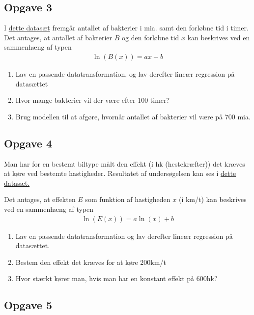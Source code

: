 \documentclass[12pt]{article}
\begin{document}
\subsection*{Opgave 3}

I \href{https://github.com/ChristianJLex/TeachingNotes/raw/master/2023-2024/Data%20og%20lign/Bakteriedata.xlsx}{\color{blue!60}dette datasæt} fremgår antallet af bakterier i mia. samt den forløbne tid i timer.
Det antages, at antallet af bakterier $B$ og den forløbne tid $x$ kan beskrives ved en sammenhæng af typen
\begin{align*}
	\ln(B(x)) = ax + b
\end{align*}
\begin{enumerate}[label=\roman*)]
	\item Lav en passende datatransformation, og lav derefter lineær regression på datasættet
	\item Hvor mange bakterier vil der være efter 100 timer?
	\item Brug modellen til at afgøre, hvornår antallet af bakterier vil være på 700 mia.
\end{enumerate}

\subsection*{Opgave 4}

Man har for en bestemt biltype målt den effekt (i hk (hestekræfter)) det kræves at køre ved bestemte hastigheder. Resultatet af undersøgelsen kan ses i \href{}{dette datasæt.}

Det antages, at effekten $E$ som funktion af hastigheden $x$ (i km/t) kan beskrives ved en sammenhæng af typen
\begin{align*}
	\ln(E(x)) = a\ln(x) + b
\end{align*}

\begin{enumerate}[label=\roman*)]
	\item Lav en passende datatransformation og lav derefter lineær regression på datasættet.
	\item Bestem den effekt det kræves for at køre 200km/t
	\item Hvor stærkt kører man, hvis man har en konstant effekt på 600hk?
\end{enumerate}

\subsection*{Opgave 5}
\end{document}
